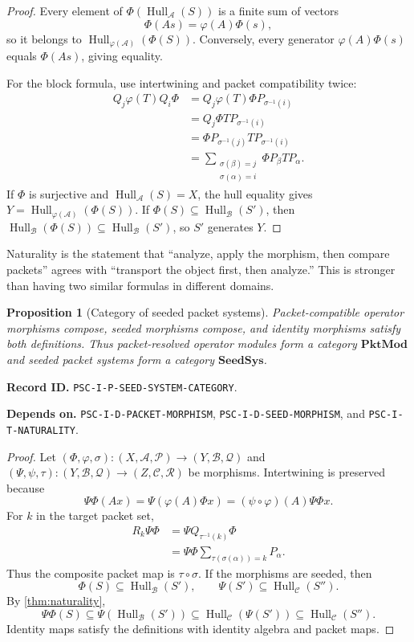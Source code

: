 \documentclass[11pt]{article}
\newtheorem{proposition}[proposition]{Proposition}
\theoremstyle{definition}
\theoremstyle{remark}
\newcommand{\A}{\mathcal A}
\newcommand{\B}{\mathcal B}
\newcommand{\Ccal}{\mathcal C}
\newcommand{\Pcal}{\mathcal P}
\newcommand{\Qcal}{\mathcal Q}
\newcommand{\Rcal}{\mathcal R}
\newcommand{\Hull}{\operatorname{Hull}}
\newcommand{\RecordID}[1]{\par\smallskip\noindent\begingroup\footnotesize\color{PSCGray}\raggedright\textbf{Record ID.} \nolinkurl{#1}.\par\endgroup}
\newcommand{\Depends}[1]{\par\noindent\begingroup\footnotesize\color{PSCGray}\raggedright\textbf{Depends on.} #1\par\endgroup}
\begin{document}
\begin{proof}
Every element of $\Phi(\Hull_\A(S))$ is a finite sum of vectors
\[
\Phi(As)=\varphi(A)\Phi(s),
\]
so it belongs to $\Hull_{\varphi(\A)}(\Phi(S))$.  Conversely, every generator $\varphi(A)\Phi(s)$ equals $\Phi(As)$, giving equality.

For the block formula, use intertwining and packet compatibility twice:
\begin{align*}
Q_j\varphi(T)Q_i\Phi
&=Q_j\varphi(T)\Phi P_{\sigma^{-1}(i)}\\
&=Q_j\Phi TP_{\sigma^{-1}(i)}\\
&=\Phi P_{\sigma^{-1}(j)}TP_{\sigma^{-1}(i)}\\
&=\sum_{\substack{\sigma(\beta)=j\\\sigma(\alpha)=i}}
\Phi P_\beta TP_\alpha.
\end{align*}
If $\Phi$ is surjective and $\Hull_\A(S)=X$, the hull equality gives $Y=\Hull_{\varphi(\A)}(\Phi(S))$.  If $\Phi(S)\subseteq\Hull_\B(S')$, then $\Hull_\B(\Phi(S))\subseteq\Hull_\B(S')$, so $S'$ generates $Y$.
\end{proof}

\begin{keyidea}
Naturality is the statement that ``analyze, apply the morphism, then compare packets'' agrees with ``transport the object first, then analyze.''  This is stronger than having two similar formulas in different domains.
\end{keyidea}


\begin{proposition}[Category of seeded packet systems]
\label{prop:seed-category}
Packet-compatible operator morphisms compose, seeded morphisms compose, and identity morphisms satisfy both definitions.  Thus packet-resolved operator modules form a category $\mathbf{PktMod}$ and seeded packet systems form a category $\mathbf{SeedSys}$.
\end{proposition}
\RecordID{PSC-I-P-SEED-SYSTEM-CATEGORY}
\Depends{\nolinkurl{PSC-I-D-PACKET-MORPHISM},
\nolinkurl{PSC-I-D-SEED-MORPHISM}, and
\nolinkurl{PSC-I-T-NATURALITY}.}

\begin{proof}
Let $(\Phi,\varphi,\sigma):(X,\A,\Pcal)\to(Y,\B,\Qcal)$ and $(\Psi,\psi,\tau):(Y,\B,\Qcal)\to(Z,\Ccal,\Rcal)$ be morphisms.  Intertwining is preserved because
\[
\Psi\Phi(Ax)
=
\Psi(\varphi(A)\Phi x)
=
(\psi\circ\varphi)(A)\Psi\Phi x.
\]
For $k$ in the target packet set,
\begin{align*}
R_k\Psi\Phi
&=\Psi Q_{\tau^{-1}(k)}\Phi\\
&=\Psi\Phi
\sum_{\tau(\sigma(\alpha))=k}P_\alpha.
\end{align*}
Thus the composite packet map is $\tau\circ\sigma$.  If the morphisms are seeded, then
\[
\Phi(S)\subseteq\Hull_\B(S'),
\qquad
\Psi(S')\subseteq\Hull_\Ccal(S'').
\]
By \cref{thm:naturality},
\[
\Psi\Phi(S)
\subseteq
\Psi(\Hull_\B(S'))
\subseteq
\Hull_\Ccal(\Psi(S'))
\subseteq
\Hull_\Ccal(S'').
\]
Identity maps satisfy the definitions with identity algebra and packet maps.
\end{proof}
\end{document}
